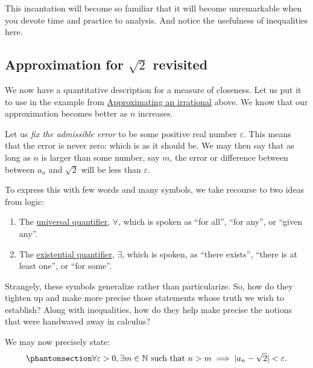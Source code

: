 \documentclass[
  a4paper,
]{article}
\begin{document}
This incantation will become so familiar that it will become
unremarkable when you devote time and practice to analysis. And notice
the usefulness of inequalities here.

\subsection{\texorpdfstring{Approximation for \(\sqrt{2}\)
revisited}{Approximation for \textbackslash sqrt\{2\} revisited}}\label{approximation-for-sqrt2-revisited}

We now have a quantitative description for a measure of closeness. Let
us put it to use in the example from
\hyperref[approximating-an-irrational]{Approximating an irrational}
above. We know that our approximation becomes better as \(n\) increases.

Let us \emph{fix the admissible error} to be some positive real number
\(\varepsilon\). This means that the error is never zero: which is as it
should be. We may then say that as long as \(n\) is larger than some
number, say \(m\), the error or difference between between \(a_{n}\) and
\(\sqrt{2}\) will be less than \(\varepsilon\).

To express this with few words and many symbols, we take recourse to two
ideas from logic:

\begin{enumerate}
\def\labelenumi{\alph{enumi}.}
\item
  The
  \href{https://en.wikipedia.org/wiki/Universal_quantification}{universal
  quantifier}, \(\forall\), which is spoken as ``for all'', ``for any'',
  or ``given any''.
\item
  The
  \href{https://en.wikipedia.org/wiki/Existential_quantification}{existential
  quantifier}, \(\exists\), which is spoken, as ``there exists'',
  ``there is at least one'', or ``for some''.
\end{enumerate}

Strangely, these symbols generalize rather than particularize. So, how
do they tighten up and make more precise those statements whose truth we
wish to establish? Along with inequalities, how do they help make
precise the notions that were handwaved away in calculus?

We may now precisely state:
\begin{equation}\phantomsection\label{eq:epsilon}{
\forall \varepsilon > 0, \exists m \in \mathbb{N} \text{ such that } n > m \implies |a_{n} - \sqrt{2}| < \varepsilon.
}\end{equation}
\end{document}

